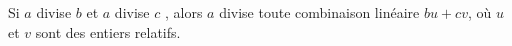 
Si $a$ divise $b$ et $a$ divise $c$ , alors $a$ divise toute combinaison linéaire $bu+cv$, où $u$ et $v$ sont des entiers relatifs.
